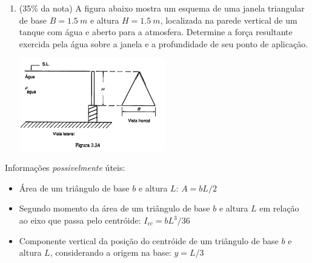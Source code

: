 \documentclass[12pt,a4paper,brazilian, fleqn]{article}
\newcommand{\ratio}[1]{(#1\% da nota)}
\begin{document}
\begin{enumerate}
    \item \ratio{35} A figura abaixo mostra um esquema de uma janela triangular de 
        base \(B=\SI{1.5}{m}\) e altura \(H=\SI{1.5}{m}\), localizada na parede 
        vertical de um tanque com água e aberto para a atmosfera. Determine a
        força resultante exercida pela água sobre a janela e a profundidade de seu ponto 
        de aplicação.

        \begin{center}
            \includegraphics[width=0.5\textwidth]{Captura de tela 2025-06-03 134107.png}
        \end{center}
\end{enumerate}

Informações \textit{possivelmente} úteis:
\begin{itemize}
    \item Área de um triângulo de base \(b\) e altura \(L\): \(A=bL/2\)
    \item Segundo momento da área de um triângulo de base \(b\) e altura \(L\) em relação ao eixo que passa pelo centróide:
        \(I_{cc} = bL^3/36\)
    \item Componente vertical da posição do centróide de um triângulo
        de base \(b\) e altura \(L\), considerando a origem na base: \(y=L/3\)
\end{itemize}
\end{document}
